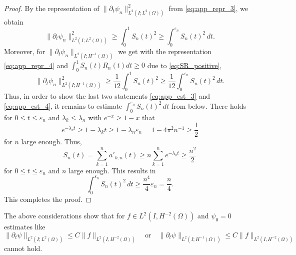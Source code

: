 \documentclass{m2an}
\newcommand{\1}{\mathds{1}}
\newcommand{\Om}{\Omega}
\theoremstyle{definition}
\begin{document}
\begin{proof}
By the representation of $\|\partial_t \psi_n\|^2_{L^2(I;L^2(\Omega))}$ from \eqref{eq:app_repr_3}, we obtain
\[
\|\partial_t \psi_n\|^2_{L^2(I;L^2(\Omega))} \ge \int_0^1 S_n(t)^2 \ge \int_0^{\varepsilon_n} S_n(t)^2\, dt. 
\]
Moreover, for $\|\partial_t \psi_n\|_{L^2(I;H^{-1}(\Om))}$  we get with the representation \eqref{eq:app_repr_4}
and $\int_0^1 S_n(t) R_n(t) dt \ge 0$ due to \eqref{eq:SR_positive}, 
\[
\|\partial_t \psi_n\|^2_{L^2(I;H^{-1}(\Omega))} \ge  \frac{1}{12}\int_0^1 S_n(t)^2 \ge \frac{1}{12} \int_0^{\varepsilon_n} S_n(t)^2\, dt. 
\]
Thus, in order to show the last two statements \eqref{eq:app_est_3} and \eqref{eq:app_est_4},
it remains to estimate $\int_0^{\varepsilon_n} S_n(t)^2\, dt$ from below.
There holds for $0\le t \le \varepsilon_n$ and $\lambda_k \le \lambda_n$ with $e^{-x} \ge 1-x$ that
\[
e^{-\lambda_k t} \ge 1 - \lambda_k t \ge  1 - \lambda_n  \varepsilon_n  = 1-4 \pi^2 n^{-1}\ge \frac{1}{2}
\]
for $n$ large enough. Thus,
\[
S_n(t) = \sum_{k=1}^n a'_{k,n}(t) \ge n \sum_{k=1}^n e^{-\lambda_k t} \ge \frac{n^2}{2}
\]
for $0\le t \le \varepsilon_n$ and $n$ large enough. This results in
\[
 \int_0^{\varepsilon_n} S_n(t)^2\, dt \ge \frac{n^4}{4} \varepsilon_n = \frac{n}{4}.
\]
This completes the proof.
\end{proof}

The above considerations show that for $f \in L^2(I,H^{-2}(\Omega))$ and $\psi_0 = 0$ estimates like
\[
\|\partial_t \psi\|_{L^2(I;L^2(\Omega))} \le C \|f\|_{L^2(I,H^{-2}(\Omega))} \quad \text{or} \quad \|\partial_t \psi\|_{L^2(I;H^{-1}(\Omega))} \le C \|f\|_{L^2(I,H^{-2}(\Omega))}
\]
cannot hold.
\end{document}
